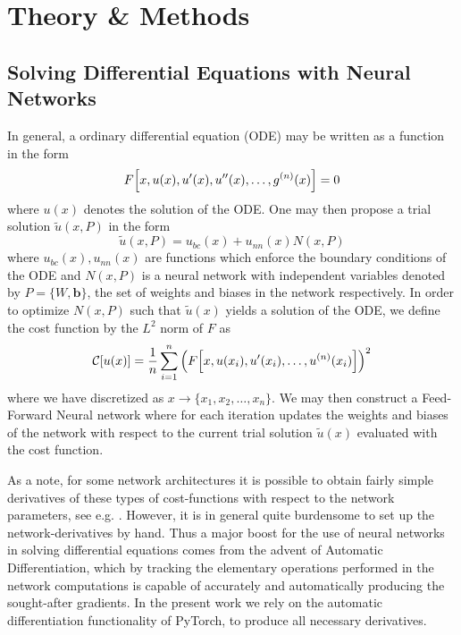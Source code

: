 \documentclass[reprint, english, nofootinbib]{revtex4-2}
\begin{document}
\section{Theory \& Methods}

\subsection{Solving Differential Equations with Neural Networks}
\noindent
In general, a ordinary differential equation (ODE) may be written as a function in the form
\begin{equation}
    F \qty[x, u(x), u'(x), u''(x), \dots, g^{(n)}(x)] = 0
\end{equation}    
where $u(x)$ denotes the solution of the ODE. One may then propose a trial solution $\tilde u(x,P)$ in the form
\begin{equation}
    \tilde u(x, P) = u_{bc}(x) + u_{nn}(x)N(x, P) 
\end{equation}
where $u_{bc}(x), u_{nn}(x)$ are functions which enforce the boundary conditions of the ODE and $N(x, P)$ is a neural network with independent variables denoted by $P = \{W, \pmb b\}$, the set of weights and biases in the network respectively. In order to optimize $N(x, P)$ such that $\tilde u(x)$ yields a solution of the ODE, we define the cost function by the $L^2$ norm of $F$ as
\begin{equation}
    \mathcal C\qty[u\qty(x)] = \frac{1}{n} \sum_{i=1}^{n}\qty(F\qty[x, u(x_i), u'(x_i), \dots, u^{(n)}(x_i)])^2
\end{equation}
where we have discretized as $x \rightarrow \{x_1, x_2 ,\dots, x_{n}\}$. We may then construct a Feed-Forward Neural network where for each iteration updates the weights and biases of the network with respect to the current trial solution $\tilde u(x)$ evaluated with the cost function. 


As a note, for some network architectures it is possible to obtain fairly simple derivatives of these types of cost-functions with respect to the network parameters, see e.g. \cite{Lagaris_1998}. However, it is in general quite burdensome to set up the network-derivatives by hand. Thus a major boost for the use of neural networks in solving differential equations comes from the advent of Automatic Differentiation, which by tracking the elementary operations performed in the network computations is capable of accurately and automatically producing the sought-after gradients. In the present work we rely on the automatic differentiation functionality of PyTorch, to produce all necessary derivatives.
\end{document}
